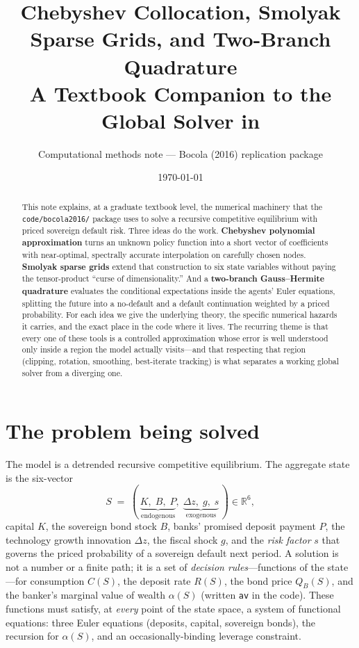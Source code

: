 \documentclass[11pt]{article}
\title{\vspace{-1.2cm}\bfseries Chebyshev Collocation, Smolyak Sparse Grids,
and Two-Branch Quadrature\\[4pt]
\large A Textbook Companion to the Global Solver in \code{code/bocola2016/}}
\author{Computational methods note --- Bocola (2016) replication package}
\date{\today}
\newcommand{\R}{\mathbb{R}}
\newcommand{\code}[1]{\texttt{#1}}
\begin{document}
\maketitle

\begin{abstract}
\noindent This note explains, at a graduate textbook level, the numerical
machinery that the \code{code/bocola2016/} package uses to solve a recursive
competitive equilibrium with priced sovereign default risk. Three ideas do
the work. \textbf{Chebyshev polynomial approximation} turns an unknown
policy function into a short vector of coefficients with near-optimal,
spectrally accurate interpolation on carefully chosen nodes.
\textbf{Smolyak sparse grids} extend that construction to six state
variables without paying the tensor-product ``curse of dimensionality.''
And a \textbf{two-branch Gauss--Hermite quadrature} evaluates the
conditional expectations inside the agents' Euler equations, splitting the
future into a no-default and a default continuation weighted by a priced
probability. For each idea we give the underlying theory, the specific
numerical hazards it carries, and the exact place in the code where it
lives. The recurring theme is that every one of these tools is a controlled
approximation whose error is well understood only inside a region the model
actually visits---and that respecting that region (clipping, rotation,
smoothing, best-iterate tracking) is what separates a working global solver
from a diverging one.
\end{abstract}

\tableofcontents

\vspace{0.5cm}
\section{The problem being solved}
\label{sec:problem}

The model is a detrended recursive competitive equilibrium. The aggregate
state is the six-vector
\[
S \;=\; (\,\underbrace{K,\;B,\;P}_{\text{endogenous}},\;
\underbrace{\Delta z,\;g,\;s}_{\text{exogenous}}\,)\in\R^{6},
\]
capital $K$, the sovereign bond stock $B$, banks' promised deposit payment
$P$, the technology growth innovation $\Delta z$, the fiscal shock $g$, and
the \emph{risk factor} $s$ that governs the priced probability of a
sovereign default next period. A solution is not a number or a finite path;
it is a set of \emph{decision rules}---functions of the state---for
consumption $C(S)$, the deposit rate $R(S)$, the bond price $Q_B(S)$, and
the banker's marginal value of wealth $\alpha(S)$ (written \code{av} in the
code). These functions must satisfy, at \emph{every} point of the state
space, a system of functional equations: three Euler equations (deposits,
capital, sovereign bonds), the recursion for $\alpha(S)$, and an
occasionally-binding leverage constraint.
\end{document}
